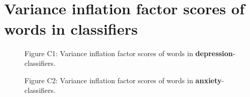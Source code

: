 \documentclass[11pt, a4paper]{article}
\begin{document}
\newpage
\section{\\ Variance inflation factor scores of words in classifiers}

\begin{figure}[hbt!]
\centering
\vspace{-0.5cm}

\caption*{Figure C1: Variance inflation factor scores of words in \textbf{depression}-classifiers.}
\end{figure}

\begin{figure}
\centering
\vspace{-0.7cm}

\caption*{Figure C2: Variance inflation factor scores of words in \textbf{anxiety}-classifiers.}
\end{figure}
\end{document}
